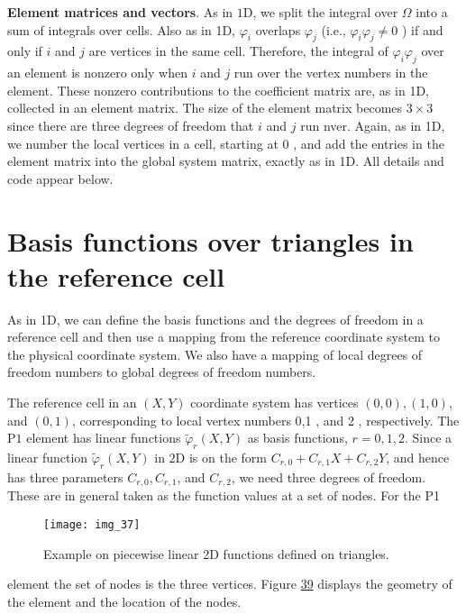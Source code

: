 \documentclass[../main.tex]{subfiles}
\begin{document}
	\noindent \textbf{Element matrices and vectors}. As in $1 \mathrm{D}$, we split the integral over $\Omega$ into a sum of integrals over cells. Also as in 1D, $\varphi_{i}$ overlaps $\varphi_{j}$ (i.e., $\varphi_{i} \varphi_{j} \neq 0$ ) if and only if $i$ and $j$ are vertices in the same cell. Therefore, the integral of $\varphi_{i} \varphi_{j}$ over an element is nonzero only when $i$ and $j$ run over the vertex numbers in the element. These nonzero contributions to the coefficient matrix are, as in 1D, collected in an element matrix. The size of the element matrix becomes $3 \times 3$ since there are three degrees of freedom that $i$ and $j$ run nver. Again, as in 1D, we number the local vertices in a cell, starting at 0 , and add the entries in the element matrix into the global system matrix, exactly as in 1D. All details and code appear below.
	\bigbreak
	\section[Basis functions over triangles in the reference cell]{Basis functions over triangles in the reference cell}
	\label{sec:sec_9_2}
	\noindent As in 1D, we can define the basis functions and the degrees of freedom in a reference cell and then use a mapping from the reference coordinate system to the physical coordinate system. We also have a mapping of local degrees of freedom numbers to global degrees of freedom numbers.
	
	The reference cell in an $(X, Y)$ coordinate system has vertices $(0,0),(1,0)$, and $(0,1)$, corresponding to local vertex numbers 0,1 , and 2 , respectively. The $\mathrm{P} 1$ element has linear functions $\tilde{\varphi}_{r}(X, Y)$ as basis functions, $r=0,1,2$. Since a linear function $\tilde{\varphi}_{r}(X, Y)$ in $2 \mathrm{D}$ is on the form $C_{r, 0}+C_{r, 1} X+C_{r, 2} Y$, and hence has three parameters $C_{r, 0}, C_{r, 1}$, and $C_{r, 2}$, we need three degrees of freedom. These are in general taken as the function values at a set of nodes. For the P1
	\begin{figure}[H]
		\centering
		\texttt{[image: img\_37]}
		\caption{Example on piecewise linear 2D functions defined on triangles.}
		\label{fig:img_37}
	\end{figure}
	\noindent element the set of nodes is the three vertices. Figure \hyperref[fig:img_39]{39} displays the geometry of the element and the location of the nodes.
	
\end{document}

